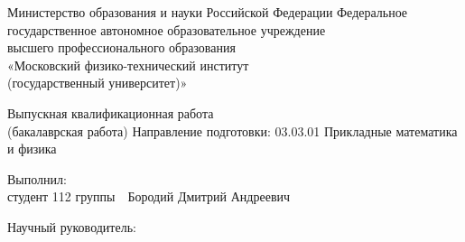 \thispagestyle{empty}

\begin{center}
{\fontsize{14}{14}\selectfont
Министерство образования и науки Российской Федерации
}
{\fontsize{12}{12}\selectfont \wl}
{\fontsize{14}{14}\selectfont
Федеральное государственное автономное образовательное учреждение \\
высшего профессионального образования\\
«Московский физико-технический институт\\
(государственный университет)»
}		
{\fontsize{12}{12}\selectfont \wl}
{\fontsize{14}{14}\selectfont \departmentName }
{\fontsize{12}{12}\selectfont \wl}
{\fontsize{14}{14}\selectfont \chairName }
{\fontsize{12}{12}\selectfont \wl\wl\wl\wl}

{\fontsize{16}{19.2}\selectfont
	{\bf \thesisTitle }
}
{\fontsize{12}{12}\selectfont \wl}
{\fontsize{14}{14}\selectfont
Выпускная квалификационная работа\\
(бакалаврская работа)
}
{\fontsize{12}{12}\selectfont \wl}
{\fontsize{14}{16.8}\selectfont
Направление подготовки: 03.03.01 Прикладные математика и физика
}
{\fontsize{12}{12}\selectfont \wl\wl\wl}
\end{center}

{\fontsize{14}{14}\selectfont
\noindent Выполнил:\\ студент 112 группы\ \hrulefill\  Бородий Дмитрий Андреевич
}

{\fontsize{12}{12}\selectfont \wl}

{\fontsize{14}{14}\selectfont
\noindent Научный руководитель:\\
\supervisorRegalia\ \hrulefill \ \supervisorFio
}
{\fontsize{12}{12}\selectfont \wl\wl\wl\wl\wl\wl\wl\wl\wl}
\begin{center}
{\thesisCity\ \thesisYear}
\end{center}

\newpage
